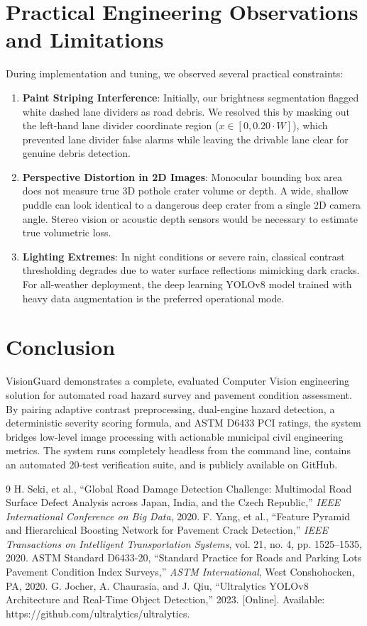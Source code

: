 \documentclass[11pt,a4paper]{article}
\begin{document}
\section{Practical Engineering Observations and Limitations}
During implementation and tuning, we observed several practical constraints:
\begin{enumerate}
    \item \textbf{Paint Striping Interference}: Initially, our brightness segmentation flagged white dashed lane dividers as road debris. We resolved this by masking out the left-hand lane divider coordinate region ($x \in [0, 0.20 \cdot W]$), which prevented lane divider false alarms while leaving the drivable lane clear for genuine debris detection.
    \item \textbf{Perspective Distortion in 2D Images}: Monocular bounding box area does not measure true 3D pothole crater volume or depth. A wide, shallow puddle can look identical to a dangerous deep crater from a single 2D camera angle. Stereo vision or acoustic depth sensors would be necessary to estimate true volumetric loss.
    \item \textbf{Lighting Extremes}: In night conditions or severe rain, classical contrast thresholding degrades due to water surface reflections mimicking dark cracks. For all-weather deployment, the deep learning YOLOv8 model trained with heavy data augmentation is the preferred operational mode.
\end{enumerate}

\section{Conclusion}
VisionGuard demonstrates a complete, evaluated Computer Vision engineering solution for automated road hazard survey and pavement condition assessment. By pairing adaptive contrast preprocessing, dual-engine hazard detection, a deterministic severity scoring formula, and ASTM D6433 PCI ratings, the system bridges low-level image processing with actionable municipal civil engineering metrics. The system runs completely headless from the command line, contains an automated 20-test verification suite, and is publicly available on GitHub.

\begin{thebibliography}{9}
H. Seki, et al., ``Global Road Damage Detection Challenge: Multimodal Road Surface Defect Analysis across Japan, India, and the Czech Republic,'' \textit{IEEE International Conference on Big Data}, 2020.
F. Yang, et al., ``Feature Pyramid and Hierarchical Boosting Network for Pavement Crack Detection,'' \textit{IEEE Transactions on Intelligent Transportation Systems}, vol. 21, no. 4, pp. 1525--1535, 2020.
ASTM Standard D6433-20, ``Standard Practice for Roads and Parking Lots Pavement Condition Index Surveys,'' \textit{ASTM International}, West Conshohocken, PA, 2020.
G. Jocher, A. Chaurasia, and J. Qiu, ``Ultralytics YOLOv8 Architecture and Real-Time Object Detection,'' 2023. [Online]. Available: https://github.com/ultralytics/ultralytics.
\end{thebibliography}
\end{document}
